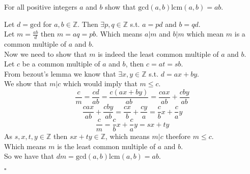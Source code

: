 \documentclass{exam}
\begin{document}
\begin{questions}

    \pagebreak
    \question For all positive integers $a$ and $b$ show that $\text{gcd}(a,b) \text{lcm}(a,b)=ab$.
    \begin{solution}
        Let $d = \text{gcd}$ for $a,b \in \mathbb{Z}$. Then $\exists p,q \in \mathbb{Z}$ s.t. $a = pd$ and $b = qd$.
        \\Let $m = \frac{ab}{d}$ then $m = aq = pb$. Which means $a|m$ and $b|m$ which mean $m$ is a common multiple of $a$ and $b$.
        \\Now we need to show that $m$ is indeed the least common multiple of $a$ and $b$.
        \\Let $c$ be a common multiple of $a$ and $b$, then $c = at = sb$.
        \\From bezout's lemma we know that $\exists x,y \in \mathbb{Z}$ s.t. $d = ax + by$.
        \\We show that $m|c$ which would imply that $m \leq c$.
        $$\frac{c}{m} =  \frac{cd}{ab} = \frac{c(ax + by)}{ab} = \frac{cax}{ab} + \frac{cby}{ab}$$
        $$\frac{cax}{ab} + \frac{cby}{ab} = \frac{cx}{b} + \frac{cy}{a} = \frac{c}{b}x + \frac{c}{a}y$$
        $$\frac{c}{m} = \frac{c}{b}x + \frac{c}{a}y = sx + ty$$
        As $s,x,t,y \in \mathbb{Z}$ then $sx + ty \in \mathbb{Z}$, which means $m|c$ theefore $m \leq c$.
        \\Which means $m$ is the least common multiple of $a$ and $b$.
        \\So we have that $dm = \text{gcd}(a,b) \text{lcm}(a,b) = ab$.
        \begin{flushright}
            $\square$
        \end{flushright}
    \end{solution}


\end{questions}
\end{document}

